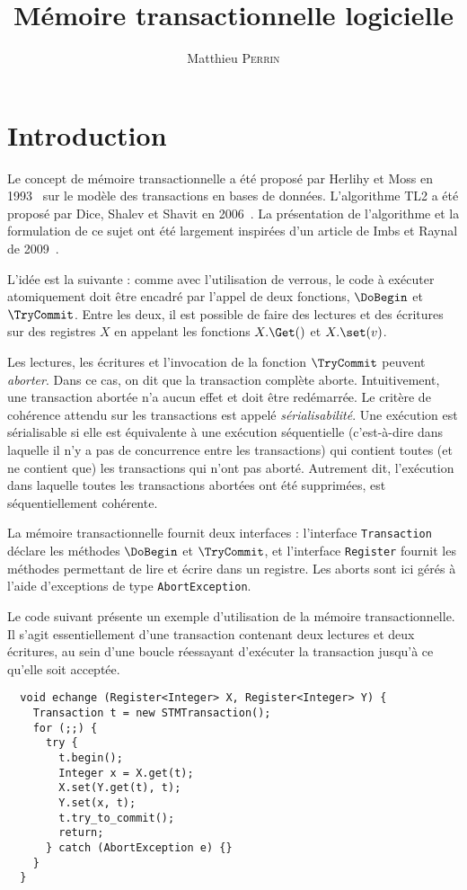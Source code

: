 \documentclass{td}
\author{Matthieu \textsc{Perrin}}
\title{Mémoire transactionnelle logicielle}
\begin{document}
\maketitle

\section{Introduction}
Le concept de mémoire transactionnelle a été proposé par Herlihy et Moss en 1993~\cite{HM} sur le modèle des transactions en bases de données.
L'algorithme TL2 a été proposé par Dice, Shalev et Shavit en 2006~\cite{DSS}. La présentation de l'algorithme et la formulation de ce sujet ont été largement inspirées
d'un article de Imbs et Raynal de 2009~\cite{IR}. 


L'idée est la suivante : comme avec l'utilisation de verrous, le code à exécuter atomiquement
doit être encadré par l'appel de deux fonctions, $\DoBegin$ et $\TryCommit$.
Entre les deux, il est possible de faire des lectures et des écritures sur des registres $X$
en appelant les fonctions $X.\Get()$ et $X.\set(v)$.

Les lectures, les écritures et l'invocation de la fonction $\TryCommit$ peuvent \emph{aborter}. Dans ce cas, on dit
que la transaction complète aborte. Intuitivement, une transaction abortée n'a aucun effet et doit être redémarrée.
Le critère de cohérence attendu sur les transactions est appelé
\emph{sérialisabilité}.
Une exécution est sérialisable si elle est équivalente à une exécution séquentielle
(c'est-à-dire dans laquelle il n'y a pas de concurrence entre les transactions)
qui contient toutes (et ne contient que) les transactions qui n'ont pas aborté.
Autrement dit, l'exécution dans laquelle toutes les transactions abortées ont été supprimées,
est séquentiellement cohérente. 

La mémoire transactionnelle fournit deux interfaces :
l'interface \lstinline{Transaction} déclare les méthodes $\DoBegin$ et $\TryCommit$,
et l'interface \lstinline{Register} fournit les méthodes permettant de
lire et écrire dans un registre. 
Les aborts sont ici gérés à l'aide d'exceptions de type \lstinline{AbortException}.

Le code suivant présente un exemple d'utilisation de la mémoire transactionnelle.
Il s'agit essentiellement d'une transaction contenant deux lectures et deux écritures,
au sein d'une boucle réessayant d'exécuter la transaction jusqu'à ce qu'elle soit acceptée.

\begin{lstlisting}
  void echange (Register<Integer> X, Register<Integer> Y) {
    Transaction t = new STMTransaction();
    for (;;) {
      try {
        t.begin();
        Integer x = X.get(t);
        X.set(Y.get(t), t);
        Y.set(x, t);
        t.try_to_commit();
        return;
      } catch (AbortException e) {}
    }
  }
\end{lstlisting}
\end{document}
